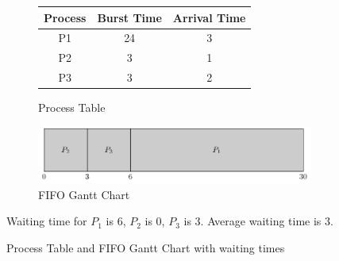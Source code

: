 \documentclass[oneside]{book}
\begin{document}
                \begin{figure}[H]
                    \centering
                    \begin{subfigure}{0.5\textwidth}
                        \centering
                        \begin{tabular}{ccc}
                            Process & Burst Time & Arrival Time\\
                            \toprule
                            P1 & 24 & 3\\
                            P2 & 3  & 1\\
                            P3 & 3  & 2\\
                            \bottomrule
                        \end{tabular}
                        \caption{Process Table}
                    \end{subfigure}%
                    \begin{subfigure}{0.5\textwidth}
                        \centering
                        \includegraphics[width=\linewidth]{figures/fifo_gantt_2.pdf}
                        \caption{FIFO Gantt Chart}
                    \end{subfigure}
                    Waiting time for $P_1$ is 6, $P_2$ is 0, $P_3$ is 3. Average waiting time is 3.
                    \caption{Process Table and FIFO Gantt Chart with waiting times}
                \end{figure}
\end{document}

